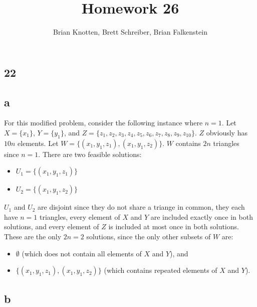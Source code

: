 \documentclass[letterpaper,notitlepage,twoside]{article}
\begin{document}
\title{Homework 26}
\author{Brian Knotten, Brett Schreiber, Brian Falkenstein}
\maketitle
\subsection*{22}
\subsection*{a}
For this modified problem, consider the following instance where $n = 1$. Let $X = \{x_1\}$, $Y = \{y_1\}$, and $Z = \{z_1, z_2, z_3, z_4, z_5, z_6, z_7, z_8, z_9, z_10\}$. $Z$ obviously has $10n$ elements. Let $W = \{(x_1, y_1, z_1), (x_1, y_1, z_2)\}$. $W$ contains $2n$ triangles since $n = 1$. There are two feasible solutions:
\begin{itemize}
\item $U_1 = \{(x_1, y_1, z_1)\}$
\item $U_2 = \{(x_1, y_1, z_2)\}$
\end{itemize}
$U_1$ and $U_2$ are disjoint since they do not share a triange in common, they each have $n = 1$ triangles, every element of $X$ and $Y$ are included exactly once in both solutions, and every element of $Z$ is included at most once in both solutions. These are the only $2n = 2$ solutions, since the only other subsets of $W$ are:
\begin{itemize}
\item $\emptyset$ (which does not contain all elements of $X$ and $Y$), and
\item $\{(x_1, y_1, z_1), (x_1, y_1, z_2)\}$ (which contains repeated elements of $X$ and $Y$).
\end{itemize}

\subsection*{b}
\end{document}
